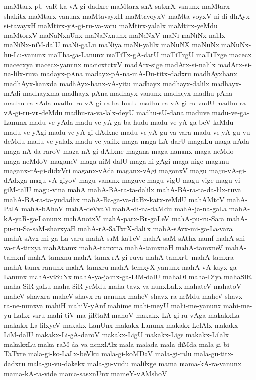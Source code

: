 {maMtarx-pU-vaR-ka-vA-gi-dadxre
maMtarx-shA-satxrX-vanunx
maMtarx-shakitx
maMtarx-vanunx
maMtavayxH
maMtavoyxV
maMta-voyxV-ni-di-dhAyx-si-tavayxH
maMtirx-yA-gi-ru-va-varu
maMtirx-yalalx
maMtirx-yeMdu
maMtorxV
maNaNxnUnx
maNaNxnunx
maNeNxV
maNi
maNiNx-nalilx
maNiNx-niM-dalU
maNi-gaLu
maNiya
maNi-yalilx
maNuNX
maNuNx
maNuNx-hu-Lu-vanunx
maTha-ga-Lanunx
maTiTx-gA-darU
maTiTxgU
maTiTxge
macecx
macecxya
macecx-yanunx
macicxtotxV
madArx-sige
madArx-si-nalilx
madArx-si-na-lilx-ruva
madayx-pAna
madayx-pA-na-mA-Du-titx-dadxru
madhAyxhanx
madhAyx-hanxda
madhAyx-hanx-vA-yitu
madhayx
madhayx-dalilx
madhayx-mAdi
madhayxma
madhayx-pAna
madhayx-vanunx
madheyx
madhu-pAna
madhu-ra-vAda
madhu-ra-vA-gi-ra-ba-hudu
madhu-ra-vA-gi-ru-vudU
madhu-ra-vA-gi-ru-vu-deMdu
madhu-ra-va-lalx-deyU
madhu-sU-dana
maduve
madu-ve-ga-Lanunx
madu-ve-yAda
madu-ve-yA-ga-ba-hudu
madu-ve-yA-ga-beV-keMdu
madu-ve-yAgi
madu-ve-yA-gi-dAdxne
madu-ve-yA-gu-va-vara
madu-ve-yA-gu-vu-deMdu
madu-ve-yalalx
madu-ve-yalilx
maga
maga-LA-darU
magaLu
maga-nAda
maga-nA-da-raroV
maga-nA-gi-dAdxne
magana
maga-nanunx
maga-neMdo
maga-neMdoV
maganeV
maga-niM-dalU
maga-ni-gAgi
maga-nige
maganu
maganx-rA-gi-didxVri
maganx-vAda
maganx-vAgi
magonxV
magu
magu-vA-gi-dAdxga
magu-vA-giyoV
magu-vanunx
maguve
magu-vigU
magu-vige
magu-vi-giM-talU
magu-vina
mahA
mahA-BA-ra-ta-dalilx
mahA-BA-ra-ta-da-lilx-ruva
mahA-BA-ra-ta-yudadhx
mahA-Ba-ga-va-daBx-katx-reMdU
mahAMtoV
mahA-PalA
mahA-bAhoV
mahA-deVvaM
mahA-di-na-daMdu
mahA-ja-na-gaLa
mahA-kA-yaR-ga-Lanunx
mahAnotxV
mahA-parx-Bu-gaLeV
mahA-pu-ru-Sara
mahA-pu-ru-Sa-saM-sharxyaH
mahA-rA-SaTxrX-dalilx
mahA-sAvx-mi-ga-La-vara
mahA-sAvx-mi-ga-La-varu
mahA-saM-kaTeV
mahA-saM-sAthx-namf
mahA-shi-va-rA-tirxya
mahAtamx
mahA-tamxna
mahA-tamxnaH
mahA-tamxneV
mahA-tamxnf
mahA-tamxnu
mahA-tamx-rA-gi-ruva
mahA-tamxrU
mahA-tamxra
mahA-tamx-ranunx
mahA-tamxru
mahA-temxyX-yanunx
mahA-vA-kayx-ga-Lanunx
mahA-viSuNx
mahA-ya-jacnx-ga-LiM-dalU
mahaDi
maha-Diya
mahaSiR
maha-SiR-gaLu
maha-SiR-yeMdu
maha-tavx-va-nunxLaLx
mahateV
mahatoV
maheV-shavxra
maheV-shavx-ra-nanunx
maheV-shavx-ra-neMdu
maheV-shavx-ra-ne-nunxva
mahiH
mahiV-yAnf
mahime
mahi-meyU
mahi-me-yanunx
mahi-me-yu-LaLx-varu
mahi-tiV-ma-jiRtaM
mahoV
makakx-LA-gi-ru-vAga
makakxLa
makakx-La-lilxyeV
makakx-LanUnx
makakx-Lanunx
makakx-LelAlx
makakx-LiM-dalU
makakx-Li-gA-daroV
makakx-LigU
makakx-Lige
makakx-Lilalx
makakxLu
maka-raM-da-va-nenxlAlx
mala
malada
mala-diMda
mala-gi-bi-TaTxre
mala-gi-ko-LaLx-beVku
mala-gi-koMDoV
mala-gi-ralu
mala-gu-titx-dadxru
mala-gu-vu-dakekx
mala-gu-vudu
malilxge
mama
mama-kA-ra-vanunx
mama-kA-ra-vide
mama-sasxnUnx
mameY-vAMshoV
}
